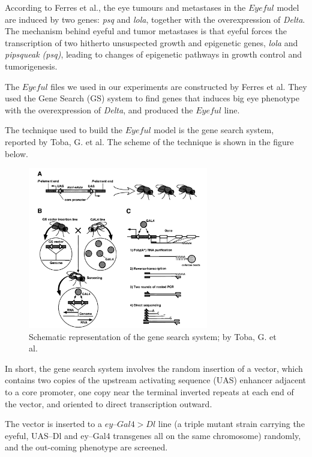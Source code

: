 According to Ferres et al., the eye tumours and metastases in the $Eyeful$ model are induced by two genes: \textit{psq} and \textit{lola}, together with the overexpression of \textit{Delta}. The mechanism behind eyeful and tumor metastases is that eyeful forces the transcription of two hitherto unsuspected growth and epigenetic genes, \textit{lola} and \textit{pipsqueak (psq)}, leading to changes of epigenetic pathways in growth control and tumorigenesis.\cite{ferres2006epigenetic}

The $Eyeful$ files we used in our experiments are constructed by Ferres et al. They used the Gene Search (GS) system to find genes that induces big eye phenotype with the overexpression of \textit{Delta}, and produced the $Eyeful$ line. 

The technique used to build the $Eyeful$ model is the gene search system, reported by Toba, G. et al.\cite{toba1999gene} The scheme of the technique is shown in the figure below.

\begin{figure}[H]
    \centering
    \includegraphics[width=0.7\textwidth]{image/gene_search.png}
    \caption{Schematic representation of the gene search system; by Toba, G. et al.}
    \label{eyeful_phenotype}
\end{figure}

In short, the gene search system involves the random insertion of a vector, which contains two copies of the upstream activating sequence (UAS) enhancer adjacent
to a core promoter, one copy near the terminal inverted repeats at each end of the vector, and oriented
to direct transcription outward. 

The vector is inserted to a $ey–Gal4 > Dl$ line (a triple mutant strain carrying the eyeful, UAS–Dl and ey–Gal4 transgenes all on the same chromosome) randomly, and the out-coming phenotype are screened.

